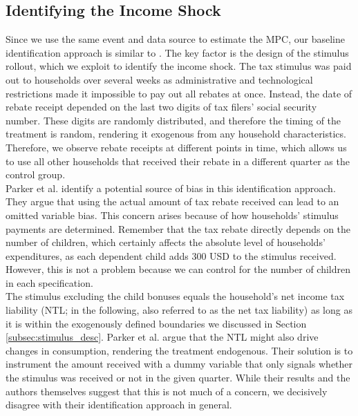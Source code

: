 \subsection{Identifying the Income Shock} \label{subsec:identification}
Since we use the same event and data source to estimate the MPC, our baseline identification approach is similar to \cite{parkeretal_2013}. The key factor is the design of the stimulus rollout, which we exploit to identify the income shock. The tax stimulus was paid out to households over several weeks as administrative and technological restrictions made it impossible to pay out all rebates at once. Instead, the date of rebate receipt depended on the last two digits of tax filers' social security number. These digits are randomly distributed, and therefore the timing of the treatment is random, rendering it exogenous from any household characteristics. Therefore, we observe rebate receipts at different points in time, which allows us to use all other households that received their rebate in a different quarter as the control group. \\
Parker et al. identify a potential source of bias in this identification approach. They argue that using the actual amount of tax rebate received can lead to an omitted variable bias. This concern arises because of how households' stimulus payments are determined. Remember that the tax rebate directly depends on the number of children, which certainly affects the absolute level of households' expenditures, as each dependent child adds 300 USD to the stimulus received. However, this is not a problem because we can control for the number of children in each specification. \\
The stimulus excluding the child bonuses equals the household's net income tax liability (NTL; in the following, also referred to as the net tax liability) as long as it is within the exogenously defined boundaries we discussed in Section \ref{subsec:stimulus_desc}. Parker et al. argue that the NTL might also drive changes in consumption, rendering the treatment endogenous. Their solution is to instrument the amount received with a dummy variable that only signals whether the stimulus was received or not in the given quarter. While their results and the authors themselves suggest that this is not much of a concern, we decisively disagree with their identification approach in general. \\
